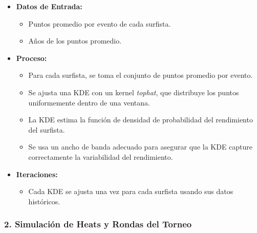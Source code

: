 \documentclass[12pt]{article}
\begin{document}
\begin{itemize}
    \item \textbf{Datos de Entrada:}
        \begin{itemize}
            \item Puntos promedio por evento de cada surfista.
            \item Años de los puntos promedio.
        \end{itemize}
    \item \textbf{Proceso:}
        \begin{itemize}
            \item Para cada surfista, se toma el conjunto de puntos promedio por evento.
            \item Se ajusta una KDE con un kernel \textit{tophat}, que distribuye los puntos uniformemente dentro de una ventana.
            \item La KDE estima la función de densidad de probabilidad del rendimiento del surfista.
            \item Se usa un ancho de banda adecuado para asegurar que la KDE capture correctamente la variabilidad del rendimiento.
        \end{itemize}
    \item \textbf{Iteraciones:}
        \begin{itemize}
            \item Cada KDE se ajusta una vez para cada surfista usando sus datos históricos.
        \end{itemize}
\end{itemize}

\subsubsection*{2. Simulación de Heats y Rondas del Torneo}
\end{document}
